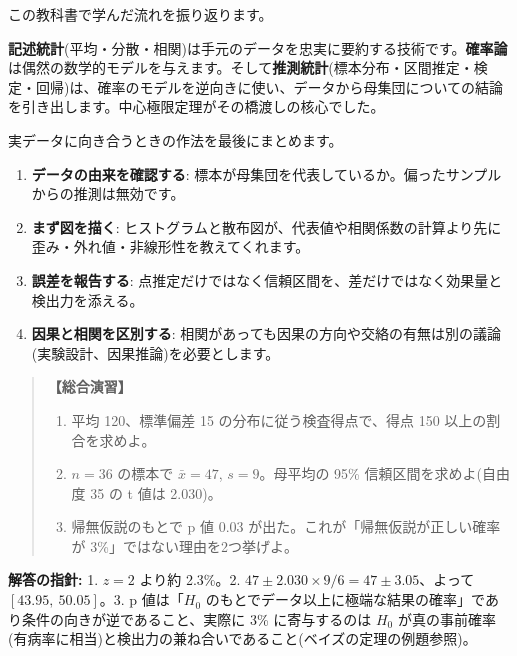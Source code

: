\documentclass{article}
\begin{document}
この教科書で学んだ流れを振り返ります。

\textbf{記述統計}(平均・分散・相関)は手元のデータを忠実に要約する技術です。\textbf{確率論}は偶然の数学的モデルを与えます。そして\textbf{推測統計}(標本分布・区間推定・検定・回帰)は、確率のモデルを逆向きに使い、データから母集団についての結論を引き出します。中心極限定理がその橋渡しの核心でした。

実データに向き合うときの作法を最後にまとめます。

\begin{enumerate}
\item \textbf{データの由来を確認する}: 標本が母集団を代表しているか。偏ったサンプルからの推測は無効です。
\item \textbf{まず図を描く}: ヒストグラムと散布図が、代表値や相関係数の計算より先に歪み・外れ値・非線形性を教えてくれます。
\item \textbf{誤差を報告する}: 点推定だけではなく信頼区間を、差だけではなく効果量と検出力を添える。
\item \textbf{因果と相関を区別する}: 相関があっても因果の方向や交絡の有無は別の議論(実験設計、因果推論)を必要とします。
\end{enumerate}

\begin{quote}
\textbf{【総合演習】}
\begin{enumerate}
\item 平均 120、標準偏差 15 の分布に従う検査得点で、得点 150 以上の割合を求めよ。
\item \(n = 36\) の標本で \(\bar{x} = 47\), \(s = 9\)。母平均の 95\% 信頼区間を求めよ(自由度 35 の t 値は 2.030)。
\item 帰無仮説のもとで p 値 0.03 が出た。これが「帰無仮説が正しい確率が 3\%」ではない理由を2つ挙げよ。
\end{enumerate}
\end{quote}

\textbf{解答の指針:} 1. \(z = 2\) より約 2.3\%。2. \(47 \pm 2.030 \times 9/6 = 47 \pm 3.05\)、よって \([43.95,\ 50.05]\)。3. p 値は「\(H_0\) のもとでデータ以上に極端な結果の確率」であり条件の向きが逆であること、実際に 3\% に寄与するのは \(H_0\) が真の事前確率(有病率に相当)と検出力の兼ね合いであること(ベイズの定理の例題参照)。
\end{document}
